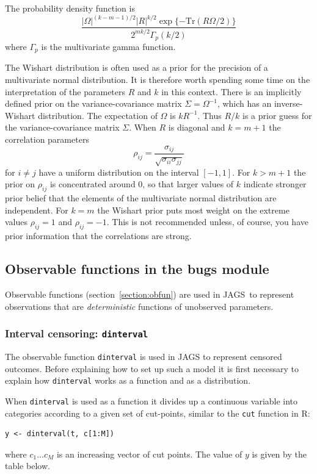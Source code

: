 \documentclass[11pt, a4paper, titlepage]{report}
\newcommand{\JAGS}{\textsf{JAGS}}
\begin{document}
The probability density function is
\[
\frac{\textstyle |\Omega|^{(k-m-1)/2} |R|^{k/2}
  \exp\{-\text{Tr}(R\Omega/2)\}} {\textstyle 2^{mk/2} \Gamma_p
  (k/2)}
\]
where $\Gamma_p$ is the multivariate gamma function.

The Wishart distribution is often used as a prior for the precision of
a multivariate normal distribution. It is therefore worth spending
some time on the interpretation of the parameters $R$ and $k$ in this
context. There is an implicitly defined prior on the
variance-covariance matrix $\Sigma = \Omega^{-1}$, which has an
inverse-Wishart distribution. The expectation of $\Omega$ is
$kR^{-1}$. Thus $R/k$ is a prior guess for the variance-covariance
matrix $\Sigma$. When $R$ is diagonal and $k=m+1$ the correlation
parameters
\[
\rho_{ij} = \frac{\sigma_{ij}}{\sqrt{\sigma_{ii} \sigma_{jj}}}
\]
for $i \neq j$ have a uniform distribution on the interval
$[-1,1]$. For $k > m+1$ the prior on $\rho_{ij}$ is concentrated
around $0$, so that larger values of $k$ indicate stronger prior
belief that the elements of the multivariate normal distribution are
independent. For $k=m$ the Wishart prior puts most weight on the
extreme values $\rho_{ij} = 1$ and $\rho_{ij} = -1$. This is not
recommended unless, of course, you have prior information that the
correlations are strong.

\subsection{Observable functions in the bugs module}
\label{section:bugs:obfun}

Observable functions (section~\ref{section:obfun}) are used in
\JAGS\ to represent observations that are {\em deterministic}
functions of unobserved parameters.

\subsubsection{Interval censoring: \texttt{dinterval}}
\label{bugs:dinterval}

The observable function \texttt{dinterval} is used in JAGS to
represent censored outcomes. Before explaining how to set up such a
model it is first necessary to explain how \texttt{dinterval} works as
a function and as a distribution.

When \texttt{dinterval} is used as a function it divides up a
continuous variable into categories according to a given set of
cut-points, similar to the \texttt{cut} function in R:
\begin{verbatim}
y <- dinterval(t, c[1:M])
\end{verbatim}
where $c_1 \ldots c_M$ is an increasing vector of cut points. The value
of $y$ is given by the table below.
\end{document}

